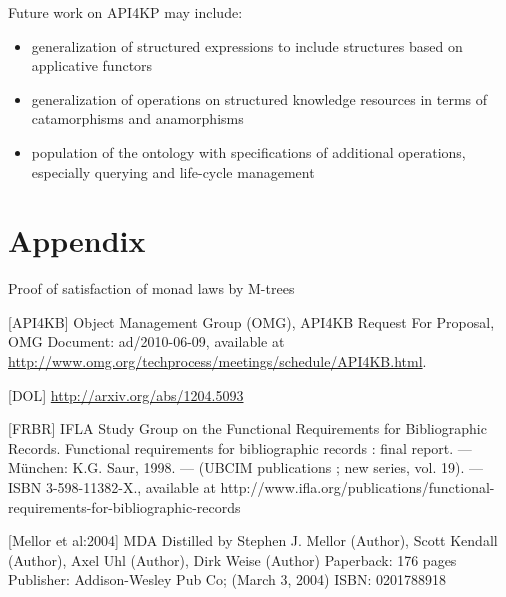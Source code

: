 \documentclass[runningheads]{llncs}
\begin{document}
Future work on API4KP may include:
\begin{itemize}
\item generalization of structured expressions to include structures based on applicative functors
\item generalization of operations on structured knowledge resources in terms of catamorphisms and anamorphisms
\item population of the ontology with specifications of additional operations, especially querying and life-cycle management
\end{itemize}

\section{Appendix}

Proof of satisfaction of monad laws by M-trees








%
%



[API4KB] Object Management Group (OMG), API4KB Request For Proposal, OMG Document: ad/2010-06-09, available at
\url {http://www.omg.org/techprocess/meetings/schedule/API4KB.html}.

[DOL] 
\url{ http://arxiv.org/abs/1204.5093 }

[FRBR] IFLA Study Group on the Functional Requirements for Bibliographic Records. Functional requirements for bibliographic records : final report. — München: K.G. Saur, 1998. — (UBCIM publications ; new series, vol. 19). — ISBN 3-598-11382-X., available at http://www.ifla.org/publications/functional-requirements-for-bibliographic-records

[Mellor et al:2004] MDA Distilled
by Stephen J. Mellor (Author), Scott Kendall (Author), Axel Uhl (Author), Dirk Weise (Author)
Paperback: 176 pages
Publisher: Addison-Wesley Pub Co; (March 3, 2004)
ISBN: 0201788918
\end{document}
